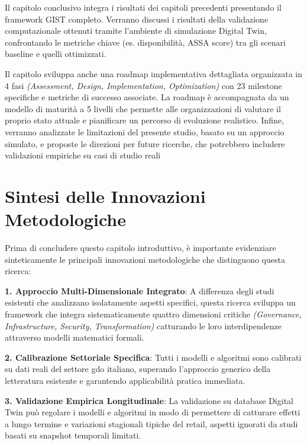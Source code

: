 

Il capitolo conclusivo integra i risultati dei capitoli precedenti presentando il framework GIST completo. Verranno discussi i risultati della validazione computazionale ottenuti tramite l'ambiente di simulazione Digital Twin, confrontando le metriche chiave (es. disponibilità, ASSA score) tra gli scenari baseline e quelli ottimizzati. 

Il capitolo sviluppa anche una roadmap implementativa dettagliata organizzata in 4 fasi \emph{(Assessment, Design, Implementation, Optimization)} con 23 milestone specifiche e metriche di successo associate. La roadmap è accompagnata da un modello di maturità a 5 livelli che permette alle organizzazioni di valutare il proprio stato attuale e pianificare un percorso di evoluzione realistico.
Infine, verranno analizzate le limitazioni del presente studio, basato su un approccio simulato, e proposte le direzioni per future ricerche, che potrebbero includere validazioni empiriche su casi di studio reali

\section{Sintesi delle Innovazioni Metodologiche}
\label{sec:sintesi_innovazioni}

Prima di concludere questo capitolo introduttivo, è importante evidenziare sinteticamente le principali innovazioni metodologiche che distinguono questa ricerca:

\textbf{1. Approccio Multi-Dimensionale Integrato}: A differenza degli studi esistenti che analizzano isolatamente aspetti specifici, questa ricerca sviluppa un framework che integra sistematicamente quattro dimensioni critiche \emph{(Governance, Infrastructure, Security, Transformation)} catturando le loro interdipendenze attraverso modelli matematici formali.

\textbf{2. Calibrazione Settoriale Specifica}: Tutti i modelli e algoritmi sono calibrati su dati reali del settore \gls{gdo} italiano, superando l'approccio generico della letteratura esistente e garantendo applicabilità pratica immediata.

\textbf{3. Validazione Empirica Longitudinale}: La validazione su database Digital Twin può regolare i modelli e algoritmi in modo di permettere di catturare effetti a lungo termine e variazioni stagionali tipiche del retail, aspetti ignorati da studi basati su snapshot temporali limitati.


